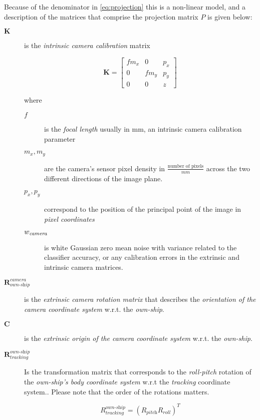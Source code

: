 Because of the denominator in \cref{eq:projection} this is a non-linear model, and a description of the matrices that comprise the projection matrix $P$ is given below:

\begin{description}
\item[$\mathbf{K}$]
is the \emph{intrinsic camera calibration} matrix

$$\mathbf{K} = \begin{bmatrix}f m_x &0 &p_x \\
0 &f m_y &p_y \\
0 &0 &z
\end{bmatrix} $$

where

\begin{description}
	\item[$f$] is the \emph{focal length} usually in mm, an intrinsic camera calibration parameter
	\item[$m_x, m_y$] are the camera's sensor pixel density in $\frac{\text{number of pixels}}{mm}$ across the two different directions of the image plane.
	\item[$p_x,p_y$] correspond to the position of the principal point of the image in \emph{pixel coordinates}
	\item[${w}_{\textit{camera}}$] is white Gaussian zero mean noise with variance related to the classifier accuracy, or any calibration errors in the extrinsic and intrinsic camera matrices.
	
\end{description}

\item[$\mathbf{R}_{\textit{own-ship}}^{\textit{camera}}$]
is the \emph{extrinsic camera rotation matrix }that describes the \emph{orientation of the camera coordinate system} w.r.t. the \emph{own-ship}.

\item[$\mathbf{C}$]
is the  \emph{extrinsic origin of the camera coordinate system} w.r.t. the \emph{own-ship}.


\item[$\mathbf{R}_{\textit{tracking}}^{\textit{own-ship}}$]
Is the transformation matrix that corresponds to the \emph{roll-pitch} rotation of the \emph{own-ship's body coordinate system} w.r.t the \emph{tracking} coordinate system.. Please note that the order of the rotations matters.

\begin{equation}
R_{\textit{tracking}}^{\textit{own-ship}}=\left( R_{\textit{pitch}} R_{\textit{roll}}\right)^T
\end{equation}


\end{description}
